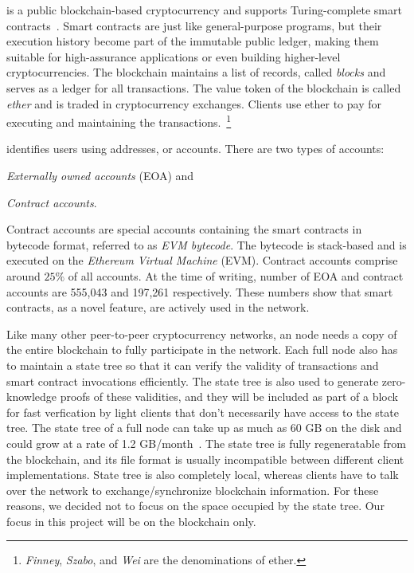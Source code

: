 
\eth{} is a public blockchain-based cryptocurrency and supports Turing-complete smart contracts~\cite{ethereum}.
Smart contracts are just like general-purpose programs, but their execution history become part of the immutable public
ledger, making them suitable for high-assurance applications or even building higher-level cryptocurrencies.
The \eth{} blockchain maintains a list of records, called \emph{blocks} and serves as a ledger for all transactions.
The value token of the blockchain is called \emph{ether} and 
is traded in cryptocurrency exchanges.
Clients use ether to pay for executing and maintaining the transactions.~\footnote{
\emph{Finney}, \emph{Szabo}, and \emph{Wei} are the denominations of ether.}

\eth{} identifies users using addresses, or accounts. There are two types of \eth{} accounts:
\renewcommand\labelenumi{(\theenumi)}
\begin{enumerate*}
	\item \emph{Externally owned accounts} (EOA) and
	\item \emph{Contract accounts}.
\end{enumerate*}
Contract accounts are special accounts containing the smart contracts in bytecode format, referred to as \emph{EVM bytecode}.
The bytecode is stack-based and is executed on the \emph{Ethereum Virtual Machine} (EVM).
Contract accounts comprise around $25\%$ of all \eth{} accounts.
At the time of writing, number of EOA and contract accounts are 555,043 and 197,261 respectively.
These numbers show that smart contracts, as a novel feature, are actively used in the \eth{} network.


Like many other peer-to-peer cryptocurrency networks, an \eth{} node needs a copy of the entire blockchain to fully participate in the network.
Each full \eth{} node also has to maintain a state tree so that it can verify
the validity of transactions and smart contract invocations efficiently.
The state tree is also used to generate zero-knowledge proofs of these validities, and they will be included as part of a block for
fast verfication by light clients that don't necessarily have access to the state tree.
The state tree of a full node can take up as much as 60 GB on the disk and could grow at a rate of 1.2 GB/month~\cite{ethdiskspace}.
The state tree is fully regeneratable from the blockchain, and its file format is usually incompatible between different client implementations.
State tree is also completely local, whereas clients have to talk over the network to exchange/synchronize blockchain information.
For these reasons, we decided not to focus on the space occupied by the state tree.
Our focus in this project will be on the blockchain only.

